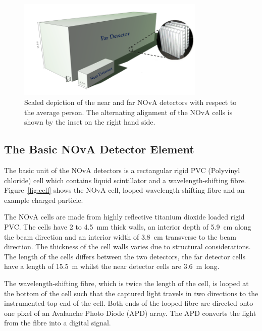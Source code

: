 \begin{figure}
  \centering
  \includegraphics[width=0.8\textwidth]{../../img/det/gen/both_detectors.png} 
  \caption{
    Scaled depiction of the near and far NOvA
    detectors with respect to the average person.
    The alternating alignment of the NOvA
    cells is shown by the inset on the right hand side. }
  \label{fig:bothDets}
\end{figure} 


\subsection{The Basic NOvA Detector Element} \label{sec:cell}

The basic unit of the NOvA detectors is a rectangular rigid PVC
(Polyvinyl chloride) cell
which contains liquid scintillator and a wavelength-shifting
fibre. %
Figure~\ref{fig:cell} shows the NOvA cell, looped wavelength-shifting
fibre and an example charged particle.

The NOvA cells are made from highly reflective titanium dioxide loaded
rigid PVC. The cells have 2 to 4.5~mm thick walls, an interior depth
of 5.9~cm along the beam direction and an interior width of 3.8~cm
transverse to the beam direction. The thickness of the cell walls
varies due to structural considerations.
The length of the cells differs
between the two detectors, the far detector cells have a length of
15.5~m whilst the near detector cells are 3.6~m long.

The wavelength-shifting fibre, which is twice
the length of the 
cell, is looped at the bottom of the cell such that the captured light
travels in two directions to the instrumented top end of the cell. 
Both ends of the looped fibre are directed onto one pixel of an
Avalanche Photo Diode (APD) array.
The APD converts the light from the fibre into a digital signal.




